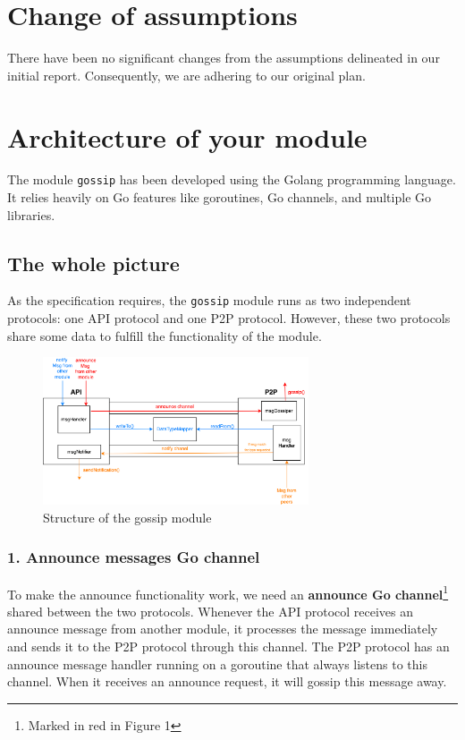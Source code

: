 \section{Change of assumptions}

There have been no significant changes from the assumptions delineated in our initial report. Consequently, we are adhering to our original plan.

\section{Architecture of your module}
The module \texttt{gossip} has been developed using the Golang programming language. It relies heavily on Go features like goroutines, Go channels, and multiple Go libraries. 

\subsection{The whole picture}

As the specification requires, the \texttt{gossip} module runs as two independent protocols: one API protocol and one P2P protocol. However, these two protocols share some data to fulfill the functionality of the module. 

\begin{figure}[H]
    \centering
    \includegraphics[width=0.7\textwidth]{pics/structure.png}
    \caption{Structure of the gossip module}
\end{figure}

\subsubsection{1. Announce messages Go channel}

To make the announce functionality work, we need an \textbf{announce Go channel}\footnote{Marked in red in Figure 1} shared between the two protocols. Whenever the API protocol receives an announce message from another module, it processes the message immediately and sends it to the P2P protocol through this channel. The P2P protocol has an announce message handler running on a goroutine that always listens to this channel. When it receives an announce request, it will gossip this message away. 

